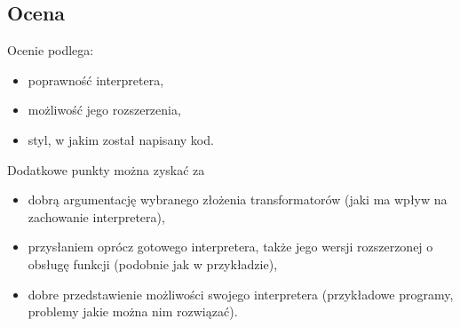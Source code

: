 \documentclass[11pt,wide]{mwart}
\begin{document}
\subsection{Ocena}
Ocenie podlega:\begin{itemize}\itemsep2pt
  \item poprawność interpretera,
  \item możliwość jego rozszerzenia,
  \item styl, w jakim został napisany kod.
\end{itemize}
\vspace{3pt}
Dodatkowe punkty można zyskać za \begin{itemize}\itemsep2pt
  \item dobrą argumentację wybranego złożenia transformatorów (jaki ma wpływ na zachowanie interpretera),
  \item przysłaniem oprócz gotowego interpretera, także jego wersji rozszerzonej o obsługę funkcji (podobnie jak w przykładzie),
  \item dobre przedstawienie możliwości swojego interpretera (przykładowe programy, problemy jakie można nim rozwiązać).
\end{itemize}


\end{document}
